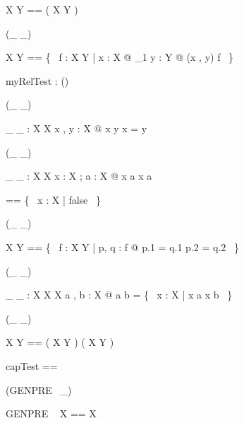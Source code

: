 \begin{zed}
X \rel Y == \power ( X \cross Y )
\end{zed}

\begin{zed}
 \rightassoc (\_ \fun \_)
\end{zed}

\begin{zed}
 X \fun Y == \{~ f : X \rel Y | \forall x : X @ \exists_1 y : Y @ (x , y) \in f ~\}
\end{zed}


\begin{axdef}
  myRelTest : \nat \fun \power (\nat \fun \nat)
\end{axdef}

\begin{zed}
\relation (\_ \neq \_)
\end{zed}

\begin{gendef}[X]
\_ \neq \_ : X \rel X
\where
\forall x , y : X @ x \neq y \iff \lnot x = y
\end{gendef}

\begin{zed}
\relation (\_ \notin \_)
\end{zed}

\begin{gendef}[X]
\_ \notin \_ : X \rel \power X
\where
\forall x : X ; a : \power X @ x \notin a \iff \lnot x \in a
\end{gendef}

\begin{zed}
\emptyset [ X ] == \{~ x : X | false ~\}
\end{zed}

\begin{zed}
 \rightassoc (\_ \pinj \_)
\end{zed}

\begin{zed}
X \pinj Y == \{~ f : X \rel Y | \forall p, q : f @ p.1 = q.1 \iff p.2 = q.2 ~\}
\end{zed}

\begin{zed}
 \leftassoc (\_ \cap \_)
\end{zed}

\begin{gendef}[X]
\_ \cap \_ : \power X \cross \power X \fun \power X
\where
\forall a , b : \power X @ a \cap b = \{~ x : X | x \in a \land x \in b 
~\}
\end{gendef}

\begin{zed}
 \rightassoc (\_ \inj \_)
\end{zed}

\begin{zed}
X \inj Y == ( X \pinj Y ) \cap ( X \fun Y )
\end{zed}

\begin{zed}
  capTest == \nat \cap \nat
\end{zed}

\begin{zed}
  \generic (GENPRE~ \_)
\end{zed}

\begin{zed}
  GENPRE ~ X == \power X
\end{zed}
